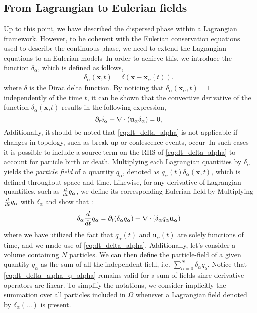 \subsection{From Lagrangian to Eulerian fields}
Up to this point, we have described the dispersed phase within a Lagrangian framework.
However, to be coherent with the Eulerian conservation equations used to describe the continuous phase, we need to extend the Lagrangian equations to an Eulerian models. 
In order to achieve this, we introduce the function $\delta_\alpha$, which is defined as follows, 
\begin{align}
    \delta_\alpha(\textbf{x},t) = \delta(\textbf{x}-\textbf{x}_\alpha(t)).
    \label{eq:delta_alpha}
\end{align}
where $\delta$ is the Dirac delta function.
By noticing that $\delta_\alpha(\textbf{x}_\alpha,t) = 1$ independently of the time $t$, it can be shown that the convective derivative of the function $\delta_\alpha(\textbf{x},t)$ results in the following expression, 
\begin{equation}
    \partial_t \delta_\alpha
    + \mathbf{\nabla}\cdot (\textbf{u}_\alpha  \delta_\alpha)
    =0,
    \label{eq:dt_delta_alpha}
\end{equation}
Additionally, it should be noted that \ref{eq:dt_delta_alpha} is not applicable if changes in topology, such as break up or coalescence events, occur.
In such cases it is possible to include a source term on the RHS of \ref{eq:dt_delta_alpha} to account for particle birth or death. 
Multiplying each Lagrangian quantities by $\delta_\alpha$ yields the \textit{particle field} of a quantity $q_\alpha$, denoted as $q_\alpha(t)\delta_\alpha(\textbf{x},t)$, which is defined throughout space and time.
Likewise, for any derivative of Lagrangian quantities, such as $\frac{d}{d t} q_\alpha$, we define its corresponding Eulerian field by Multiplying $\frac{d}{d t} q_\alpha$ with $\delta_\alpha$ and show that :
\begin{equation}
    \delta_\alpha \frac{d}{d t} q_\alpha
    = \partial_t (\delta_\alpha q_\alpha)
    + \mathbf{\nabla}\cdot (\delta_\alpha q_\alpha \textbf{u}_\alpha)
    \label{eq:dt_delta_alpha_q_alpha}
\end{equation}
where we have utilized the fact that $q_\alpha(t)$ and $\textbf{u}_\alpha(t)$ are solely functions of time, and we made use of \ref{eq:dt_delta_alpha}.
Additionally, let's consider a volume containing $N$ particles.
We can then define the particle-field of a given quantity $q_\alpha$ as the sum of all the independent field, i.e. $\sum_{\alpha=0}^N \delta_\alpha q_\alpha$.
Notice that \ref{eq:dt_delta_alpha_q_alpha} remains valid for a sum of fields since derivative operators are linear.
To simplify the notations, we consider implicitly the summation over all particles included in $\Omega$ whenever a Lagrangian field denoted by $\delta_\alpha (\ldots)$ is present.

